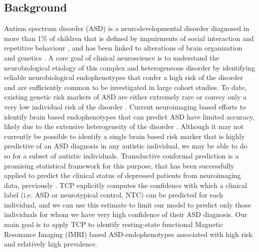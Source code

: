 \documentclass[9pt,lineno]{elife}
\begin{document}
\subsection{Background}
Autism spectrum disorder (ASD) is a neurodevelopmental disorder diagnosed in more than 1\% of children \citep{Bai2019-hb} that is defined by impairments of social interaction and repetitive behaviour \citep{American_Psychiatric_Association2013-ka}, and has been linked to alterations of brain organization \citep{Holiga2019-ub} and genetics \citep{Grove2019-vz}. A core goal of clinical neuroscience is to understand the neurobiological etiology of this complex and heterogeneous disorder \citep{Lombardo2019-mf} by identifying reliable neurobiological endophenotypes that confer a high risk of the disorder and are sufficiently common to be investigated in large cohort studies. To date, existing genetic risk markers of ASD are either extremely rare \citep[e.g. monogenic disorders, ][]{De_la_Torre-Ubieta2016-fw} or convey only a very low individual risk of the disorder \citep[e.g. common genetic risk factors, ][]{Sanders2015-ef}. Current neuroimaging based efforts to identify brain based endophenotypes that can predict ASD \citep{Abraham2017-vf,Heinsfeld2018-yl} have limited accuracy, likely due to the extensive heterogeneity of the disorder \citep[][see also ]{Lombardo2019-mf,Jacob2019-zf}. Although it may not currently be possible to identify a single brain based risk marker that is highly predictive of an ASD diagnosis in any autistic individual, we may be able to do so for a subset of autistic individuals. Transductive conformal prediction \citep[TCP, ][]{Vapnik1998-vb,Vovk2005-uc} is a promising statistical framework  for this purpose, that has been successfully applied to predict the clinical status of depressed patients from neuroimaging data, previously \citep{Nouretdinov2011-ph}. TCP explicitly computes the confidence with which a clinical label (i.e. ASD or neurotypical control, NTC) can be predicted for each individual, and we can use this estimate to limit our model to predict only those individuals for whom we have very high confidence of their ASD diagnosis. Our main goal is to apply TCP to identify resting-state functional Magnetic Resonance Imaging (fMRI) based ASD-endophenotypes associated with high risk and relatively high prevalence.
\end{document}
